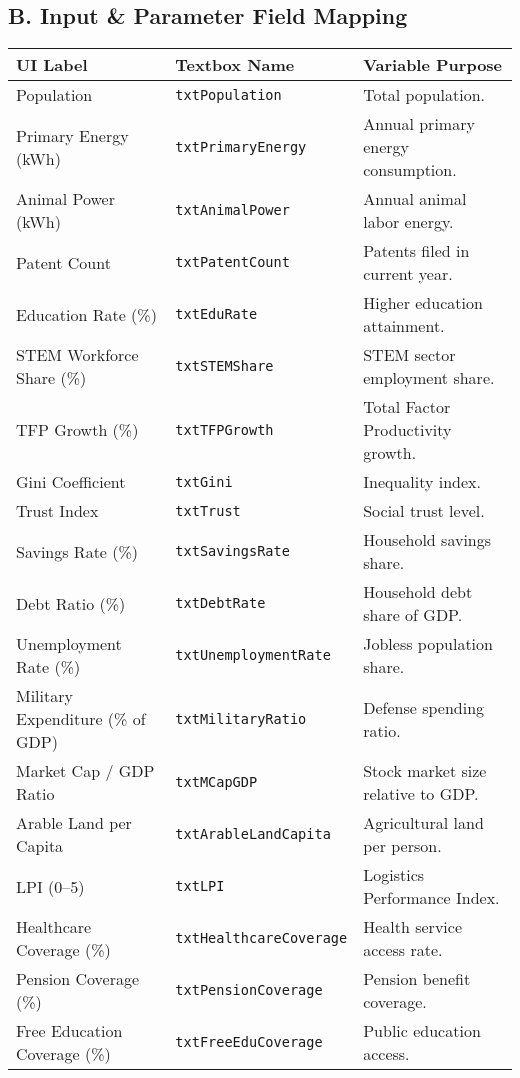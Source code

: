 \documentclass[12pt,a4paper]{article}
\begin{document}
\subsection{B. Input \& Parameter Field Mapping}
\begin{longtable}{p{4cm} p{4cm} p{7cm}}
\toprule
\textbf{UI Label} & \textbf{Textbox Name} & \textbf{Variable Purpose} \\
\midrule
Population & \texttt{txtPopulation} & Total population. \\
Primary Energy (kWh) & \texttt{txtPrimaryEnergy} & Annual primary energy consumption. \\
Animal Power (kWh) & \texttt{txtAnimalPower} & Annual animal labor energy. \\
Patent Count & \texttt{txtPatentCount} & Patents filed in current year. \\
Education Rate (\%) & \texttt{txtEduRate} & Higher education attainment. \\
STEM Workforce Share (\%) & \texttt{txtSTEMShare} & STEM sector employment share. \\
TFP Growth (\%) & \texttt{txtTFPGrowth} & Total Factor Productivity growth. \\
Gini Coefficient & \texttt{txtGini} & Inequality index. \\
Trust Index & \texttt{txtTrust} & Social trust level. \\
Savings Rate (\%) & \texttt{txtSavingsRate} & Household savings share. \\
Debt Ratio (\%) & \texttt{txtDebtRate} & Household debt share of GDP. \\
Unemployment Rate (\%) & \texttt{txtUnemploymentRate} & Jobless population share. \\
Military Expenditure (\% of GDP) & \texttt{txtMilitaryRatio} & Defense spending ratio. \\
Market Cap / GDP Ratio & \texttt{txtMCapGDP} & Stock market size relative to GDP. \\
Arable Land per Capita & \texttt{txtArableLandCapita} & Agricultural land per person. \\
LPI (0–5) & \texttt{txtLPI} & Logistics Performance Index. \\
Healthcare Coverage (\%) & \texttt{txtHealthcareCoverage} & Health service access rate. \\
Pension Coverage (\%) & \texttt{txtPensionCoverage} & Pension benefit coverage. \\
Free Education Coverage (\%) & \texttt{txtFreeEduCoverage} & Public education access. \\

\end{longtable}
\end{document}
